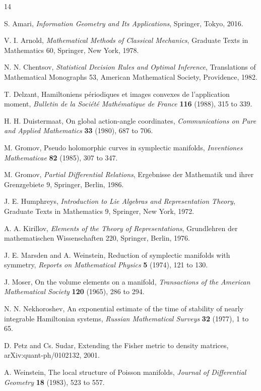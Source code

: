 \documentclass[11pt,letterpaper]{article}
\theoremstyle{definition}
\theoremstyle{remark}
\begin{document}
\begin{thebibliography}{14}

S. Amari,
\emph{Information Geometry and Its Applications},
Springer, Tokyo, 2016.

V. I. Arnold,
\emph{Mathematical Methods of Classical Mechanics},
Graduate Texts in Mathematics 60, Springer, New York, 1978.

N. N. Chentsov,
\emph{Statistical Decision Rules and Optimal Inference},
Translations of Mathematical Monographs 53, American Mathematical Society, Providence, 1982.

T. Delzant,
Hamiltoniens p\'{e}riodiques et images convexes de l'application moment,
\emph{Bulletin de la Soci\'{e}t\'{e} Math\'{e}matique de France} \textbf{116} (1988), 315 to 339.

H. H. Duistermaat,
On global action-angle coordinates,
\emph{Communications on Pure and Applied Mathematics} \textbf{33} (1980), 687 to 706.

M. Gromov,
Pseudo holomorphic curves in symplectic manifolds,
\emph{Inventiones Mathematicae} \textbf{82} (1985), 307 to 347.

M. Gromov,
\emph{Partial Differential Relations},
Ergebnisse der Mathematik und ihrer Grenzgebiete 9, Springer, Berlin, 1986.

J. E. Humphreys,
\emph{Introduction to Lie Algebras and Representation Theory},
Graduate Texts in Mathematics 9, Springer, New York, 1972.

A. A. Kirillov,
\emph{Elements of the Theory of Representations},
Grundlehren der mathematischen Wissenschaften 220, Springer, Berlin, 1976.

J. E. Marsden and A. Weinstein,
Reduction of symplectic manifolds with symmetry,
\emph{Reports on Mathematical Physics} \textbf{5} (1974), 121 to 130.

J. Moser,
On the volume elements on a manifold,
\emph{Transactions of the American Mathematical Society} \textbf{120} (1965), 286 to 294.

N. N. Nekhoroshev,
An exponential estimate of the time of stability of nearly integrable Hamiltonian systems,
\emph{Russian Mathematical Surveys} \textbf{32} (1977), 1 to 65.

D. Petz and Cs. Sudar,
Extending the Fisher metric to density matrices,
arXiv:quant-ph/0102132, 2001.

A. Weinstein,
The local structure of Poisson manifolds,
\emph{Journal of Differential Geometry} \textbf{18} (1983), 523 to 557.

\end{thebibliography}
\end{document}
